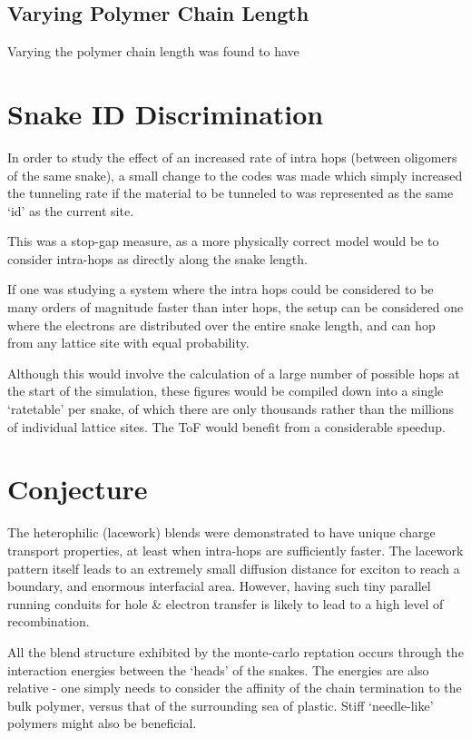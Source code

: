 \documentclass[twocolumn,a4,notitlepage]{report}
\begin{document}
\subsection{Varying Polymer Chain Length}

Varying the polymer chain length was found to have 

\section{Snake ID Discrimination}

In order to study the effect of an increased rate of intra hops (between
oligomers of the same snake), a small change to the codes was made which
simply increased the tunneling rate if the material to be tunneled to was
represented as the same `id' as the current site.

This was a stop-gap measure, as a more physically correct model would be to
consider intra-hops as directly along the snake length. 

If one was studying a system where the intra hops could be considered to be
many orders of magnitude faster than inter hops, the setup can be considered
one where the electrons are distributed over the entire snake length, and
can hop from any lattice site with equal probability.

Although this would involve the calculation of a large number of possible
hops at the start of the simulation, these figures would be compiled down
into a single `ratetable' per snake, of which there are only thousands
rather than the millions of individual lattice sites. The ToF would benefit
from a considerable speedup.

\section{Conjecture}

The heterophilic (lacework) blends were demonstrated to have unique charge
transport properties, at least when intra-hops are sufficiently faster. The
lacework pattern itself leads to an extremely small diffusion distance for
exciton to reach a boundary, and enormous interfacial area. However, having
such tiny parallel running conduits for hole \& electron transfer is likely
to lead to a high level of recombination.

All the blend structure exhibited by the monte-carlo reptation occurs
through the interaction energies between the `heads' of the snakes. The
energies are also relative - one simply needs to consider the affinity of
the chain termination to the bulk polymer, versus that of the surrounding
sea of plastic. Stiff `needle-like' polymers might also be beneficial.
\end{document}
